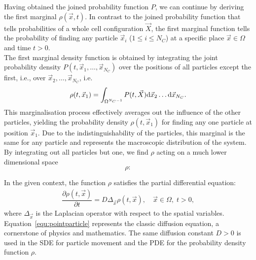 Having obtained the joined probability function $P$, we can continue by deriving the first marginal $\rho(\vec{x}, t)$. 
In contrast to the joined probability function that tells probabilities of a whole cell configuration $\vec{X}$, the first marginal function tells the probability of finding any particle $\vec{x}_i$ ($1 \leq i \leq N_C$) at a specific place $\vec{x} \in \Omega$ and time $t > 0$. \\

The first marginal density function is obtained by integrating the joint probability density $P(t, \vec{x}_1, \dots, \vec{x}_{N_C})$ over the positions of all particles except the first, i.e., over $\vec{x}_2, \dots, \vec{x}_{N_C}$, i.e.
\[
	\rho(t, \vec{x}_1) = \int_{\Omega^{N_C-1}}  P(t, \vec{X}) \mathrm{d} \vec{x}_2 \ldots \mathrm{d} \vec{x}_{N_C}.
\]
This marginalisation process effectively averages out the influence of the other particles, yielding the probability density $\rho(t, \vec{x}_1)$ for finding any one particle at position $\vec{x}_1$. 
Due to the indistinguishability of the particles, this marginal is the same for any particle and represents the macroscopic distribution of the system.
By integrating out all particles but one, we find $\rho$ acting on a much lower dimensional space 
\[
\rho: 
\]




In the given context, the function $\rho$ satisfies the partial differential equation:
\begin{align}
	\dfrac{\partial \rho (t, \vec{x})}{\partial t} = D \Delta_{\vec{x}} \rho(t, \vec{x}), \quad \vec{x} \in \Omega, \; t>0, 
	\label{equ:pointparticle}
\end{align}
where $\Delta_{\vec{x}}$ is the Laplacian operator with respect to the spatial variables. \\
Equation~\eqref{equ:pointparticle} represents the classic diffusion equation, a cornerstone of physics and mathematics.
The same diffusion constant $D>0$ is used in the SDE for particle movement and the PDE for the probability density function $\rho$. \\



